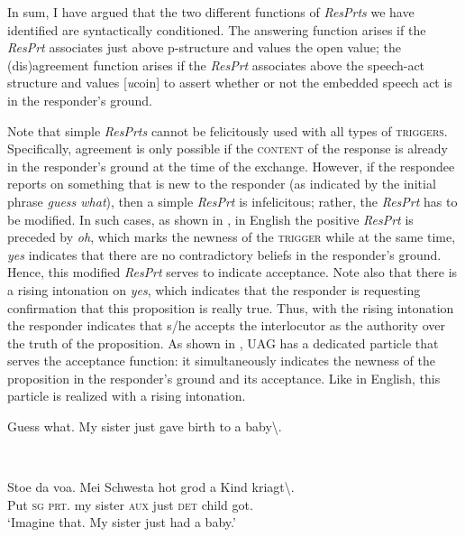 \documentclass[output=paper]{LSP/langsci}
\begin{document}
\noindent In sum, I have argued that the two different functions of \textit{ResPrts} we have identified are syntactically conditioned.
The answering function arises if the \textit{ResPrt} associates just above p-structure and values the open  value; the (dis)agreement function arises if the \textit{ResPrt} associates above the speech-act structure and values [\textit{u}coin] to assert whether or not the embedded speech act is in the responder’s ground.

Note that simple \textit{ResPrts} cannot be felicitously used with all types of  \textsc{triggers.} Specifically, agreement is only possible if the \textsc{content} of the response is already in the responder’s ground at the time of the exchange. However, if the respondee reports on something that is new to the responder (as indicated by the initial phrase \textit{guess what}), then a simple \textit{ResPrt} is infelicitous; rather, the \textit{ResPrt} has to be modified.
In such cases, as shown in , in English the positive \textit{ResPrt} is preceded by \textit{oh}, which marks the newness of the \textsc{trigger} while at the same time, \textit{yes} indicates that there are no contradictory beliefs in the responder’s ground.
Hence, this modified \textit{ResPrt} serves to indicate acceptance.
Note also that there is a rising intonation on \textit{yes}, which indicates that the responder is requesting confirmation that this proposition is really true.
Thus, with the rising intonation the responder indicates that s/he accepts the interlocutor as the authority over the truth of the proposition. As shown in , UAG has a dedicated particle that serves the acceptance function: it simultaneously indicates the newness of the proposition in the responder’s ground and its acceptance.
Like in English, this particle is realized with a rising intonation. 


\ea\label{ex:wiltschko:65}
\begin{xlist}
  Guess what. {My sister just gave birth to a baby}{\textbackslash}.
 \begin{xlisti}
 \end{xlisti}
\end{xlist}
\z

\ea\label{ex:wiltschko:66}
\\
\begin{xlist}
 \gll Stoe  da  voa.  Mei Schwesta  hot   grod  a      Kind  kriagt{\textbackslash}. \\
     Put  \textsc{sg}  \textsc{prt}. my  sister  \textsc{aux} just  \textsc{det} child  got.\\
 \glt ‘Imagine that. My sister just had a baby.’
\begin{xlisti}
\end{xlisti}
\end{xlist}
\z{}
\end{document}
